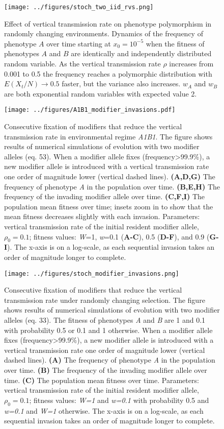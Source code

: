 \documentclass[]{article}
\begin{document}
\begin{figure}
\centering
\texttt{[image: ../figures/stoch\_two\_iid\_rvs.png]}
\caption{Effect of vertical transmission rate on phenotype polymorphism
in randomly changing environments. Dynamics of the frequency of phenotype
\(A\) over time starting
at \(x_0=10^{-5}\) when the fitness of phenotypes \(A\) and \(B\) are
identically and independently distributed random variable. As the vertical transmission rate \(\rho\) increases
from 0.001 to 0.5 the frequency reaches a polymorphic distribution with \(E(X_t/N)\to0.5\) faster, but
the variance also increases. \(w_A\) and \(w_B\) are both exponential
random variables with expected value 2.}\label{fig:stoch_two_iid_rvs}
\end{figure}

\begin{figure}
\centering
\texttt{[image: ../figures/A1B1\_modifier\_invasions.pdf]}
\caption{Consecutive fixation of modifiers that reduce the vertical
transmission rate in environmental regime \emph{A1B1}. The figure shows
results of numerical simulations of evolution with two modifier alleles
(eq. 53). When a modifier allele fixes
(frequency\textgreater{}99.9\%), a new modifier allele is introduced
with a vertical transmission rate one order of magnitude lower (vertical
dashed lines). \textbf{(A,D,G)} The frequency of phenotype \emph{A} in
the population over time. \textbf{(B,E,H)} The frequency of the invading
modifier allele over time. \textbf{(C,F,I)} The population mean
fitness over time; insets zoom in to show that the mean fitness 
decreases slightly with each invasion. Parameters: vertical transmission rate of
the initial resident modifier allele, \(\rho_0 =0.1\); fitness values:
\emph{W}=1, \emph{w}=0.1 (\textbf{A-C}), 0.5 (\textbf{D-F}), and 0.9
(\textbf{G-I}). The x-axis is on a log-scale, as each sequential invasion
takes an order of magnitude longer to
complete.}\label{fig:A1B1_modifier_invasions}
\end{figure}

\begin{figure}
\centering
\texttt{[image: ../figures/stoch\_modifier\_invasions.png]}
\caption{Consecutive fixation of modifiers that reduce the vertical
transmission rate under randomly changing selection. The figure shows
results of numerical simulations of evolution with two modifier alleles
(eq. 33). The
fitness of phenotypes \emph{A} and \emph{B} are 1 and 0.1 with probability 0.5 or 0.1 and 1 otherwise.
When a modifier allele fixes
(frequency\textgreater{}99.9\%), a new modifier allele is introduced
with a vertical transmission rate one order of magnitude lower (vertical
dashed lines). \textbf{(A)} The frequency of phenotype \emph{A} in the
population over time. \textbf{(B)} The frequency of the invading
modifier allele over time. \textbf{(C)} The population mean fitness over time. Parameters: vertical transmission rate of the initial
resident modifier allele, \(\rho_0 =0.1\); fitness values: \emph{W=1}
and \emph{w=0.1} with probability 0.5 and \emph{w=0.1} and \emph{W=1}
otherwise. The x-axis is on a log-scale, as each sequential invasion takes
an order of magnitude longer to
complete.}\label{fig:stoch_modifier_invasions}
\end{figure}
\end{document}
